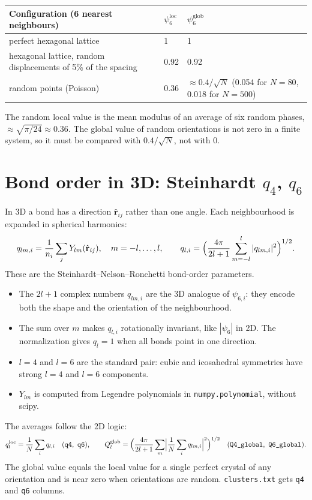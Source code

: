 \documentclass[11pt]{article}
\newcommand{\code}[1]{\texttt{#1}}
\begin{document}
\begin{center}
\begin{tabularx}{\textwidth}{@{}L l L@{}}
\toprule
Configuration (6 nearest neighbours) & $\psi_6^{\mathrm{loc}}$ & $\psi_6^{\mathrm{glob}}$ \\
\midrule
perfect hexagonal lattice & 1 & 1 \\
hexagonal lattice, random displacements of 5\% of the spacing & 0.92 & 0.92 \\
random points (Poisson) & 0.36 & $\approx0.4/\sqrt N$ (0.054 for $N=80$, 0.018 for $N=500$) \\
\bottomrule
\end{tabularx}
\end{center}
The random local value is the mean modulus of an average of six random
phases, $\approx\sqrt{\pi/24}\approx0.36$. The global value of random
orientations is not zero in a finite system, so it must be compared with
$0.4/\sqrt N$, not with 0.

\section{\texorpdfstring{Bond order in 3D: Steinhardt $q_4$, $q_6$}{Bond order in 3D: Steinhardt q4, q6}}

In 3D a bond has a direction $\hat{\mathbf r}_{ij}$ rather than one angle. Each
neighbourhood is expanded in spherical harmonics:
\begin{equation}
  q_{lm,i} = \frac1{n_i}\sum_j Y_{lm}(\hat{\mathbf r}_{ij}),\quad m=-l,\dots,l,
  \qquad
  q_{l,i} = \Bigl(\frac{4\pi}{2l+1}\sum_{m=-l}^{l}|q_{lm,i}|^2\Bigr)^{1/2}.
\end{equation}
These are the Steinhardt--Nelson--Ronchetti bond-order parameters.
\begin{itemize}[nosep]
  \item The $2l+1$ complex numbers $q_{lm,i}$ are the 3D analogue of
        $\psi_{6,i}$: they encode both the shape and the orientation of the
        neighbourhood.
  \item The sum over $m$ makes $q_{l,i}$ rotationally invariant, like
        $|\psi_6|$ in 2D. The normalization gives $q_l=1$ when all bonds
        point in one direction.
  \item $l=4$ and $l=6$ are the standard pair: cubic and icosahedral
        symmetries have strong $l=4$ and $l=6$ components.
  \item $Y_{lm}$ is computed from Legendre polynomials in
        \code{numpy.polynomial}, without scipy.
\end{itemize}
The averages follow the 2D logic:
\begin{equation}
  q_l^{\mathrm{loc}} = \frac1N\sum_i q_{l,i}
  \quad(\code{q4},\ \code{q6}),\qquad
  Q_l^{\mathrm{glob}} = \Bigl(\frac{4\pi}{2l+1}\sum_m
     \Bigl|\frac1N\sum_i q_{lm,i}\Bigr|^2\Bigr)^{1/2}
  \quad(\code{Q4\_global},\ \code{Q6\_global}).
\end{equation}
The global value equals the local value for a single perfect crystal of any
orientation and is near zero when orientations are random.
\code{clusters.txt} gets \code{q4} and \code{q6} columns.
\end{document}
